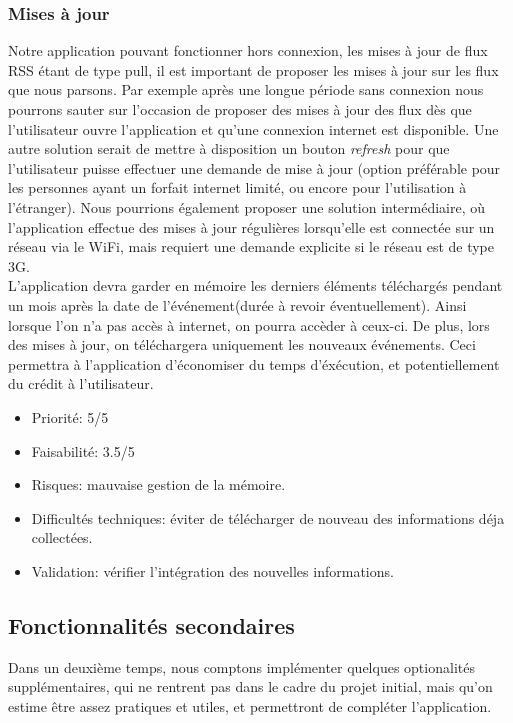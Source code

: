 \documentclass [pdftex,12pt] {report}
\begin{document}
\subsubsection{Mises à jour}
Notre application pouvant fonctionner hors connexion, les mises à jour de flux RSS étant de type pull, il est important de proposer les mises à jour sur les flux que nous parsons. Par exemple après une longue période sans connexion nous pourrons sauter sur l'occasion de proposer des mises à jour des flux dès que l'utilisateur ouvre l'application et qu'une connexion internet est disponible. Une autre solution serait de mettre à disposition un bouton \emph{refresh} pour que l'utilisateur puisse effectuer une demande de mise à jour (option préférable pour les personnes ayant un forfait internet limité, ou encore pour l'utilisation à l'étranger). Nous pourrions également proposer une solution intermédiaire, où l'application effectue des mises à jour régulières lorsqu'elle est connectée sur un réseau via le WiFi, mais requiert une demande explicite si le réseau est de type 3G. \\
L'application devra garder en mémoire les derniers éléments téléchargés pendant un mois après la date de l'événement(durée à revoir éventuellement). Ainsi lorsque l'on n'a pas accès à internet, on pourra accèder à ceux-ci. De plus, lors des mises à jour, on téléchargera uniquement les nouveaux événements. Ceci permettra à l'application d'économiser du temps d'éxécution, et potentiellement du crédit à l'utilisateur. \\

\begin{itemize}
\renewcommand{\labelitemi}{$\bullet$}
\item Priorité: 5/5
\item Faisabilité: 3.5/5
\item Risques: mauvaise gestion de la mémoire.
\item Difficultés techniques: éviter de télécharger de nouveau des informations déja collectées.
\item Validation: vérifier l'intégration des nouvelles informations.
\end{itemize}


\subsection{Fonctionnalités secondaires}
Dans un deuxième temps, nous comptons implémenter quelques optionalités supplémentaires, qui ne rentrent pas dans le cadre du projet initial, mais qu'on estime être assez pratiques et utiles, et permettront de compléter l'application.
\end{document}
